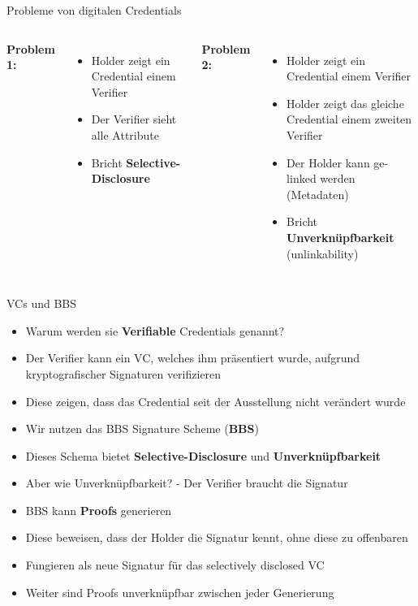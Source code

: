 \documentclass[
	german,%
	authorontitle=true,
	]{bfhbeamer}
\begin{document}
\begin{frame}{Probleme von digitalen Credentials}
    \begin{columns}[onlytextwidth,T]
        \column{70mm}  
        \textbf{Problem 1:}
        \begin{itemize}
            \item Holder zeigt ein Credential einem Verifier
            \item Der Verifier sieht alle Attribute
            \item Bricht \textbf{Selective-Disclosure}
        \end{itemize}

        \column{70mm}  
        \textbf{Problem 2:}
        \begin{itemize}
            \item Holder zeigt ein Credential einem Verifier
            \item Holder zeigt das gleiche Credential einem zweiten Verifier
            \item Der Holder kann ge-linked werden (Metadaten)
            \item Bricht \textbf{Unverknüpfbarkeit} (unlinkability)
        \end{itemize}

    \end{columns}
\end{frame}


\begin{frame}{VCs und BBS}
    \begin{itemize}
        \item Warum werden sie \textbf{Verifiable} Credentials genannt?
        \item Der Verifier kann ein VC, welches ihm präsentiert wurde, aufgrund kryptografischer Signaturen verifizieren
        \item Diese zeigen, dass das Credential seit der Ausstellung nicht verändert wurde
        \item Wir nutzen das BBS Signature Scheme (\textbf{BBS}) 
        \item Dieses Schema bietet \textbf{Selective-Disclosure} und \textbf{Unverknüpfbarkeit}
        \item Aber wie Unverknüpfbarkeit? - Der Verifier braucht die Signatur
        \item BBS kann \textbf{Proofs} generieren
        \item Diese beweisen, dass der Holder die Signatur kennt, ohne diese zu offenbaren
        \item Fungieren als neue Signatur für das selectively disclosed VC
        \item Weiter sind Proofs unverknüpfbar zwischen jeder Generierung
    \end{itemize}
\end{frame}
\end{document}
